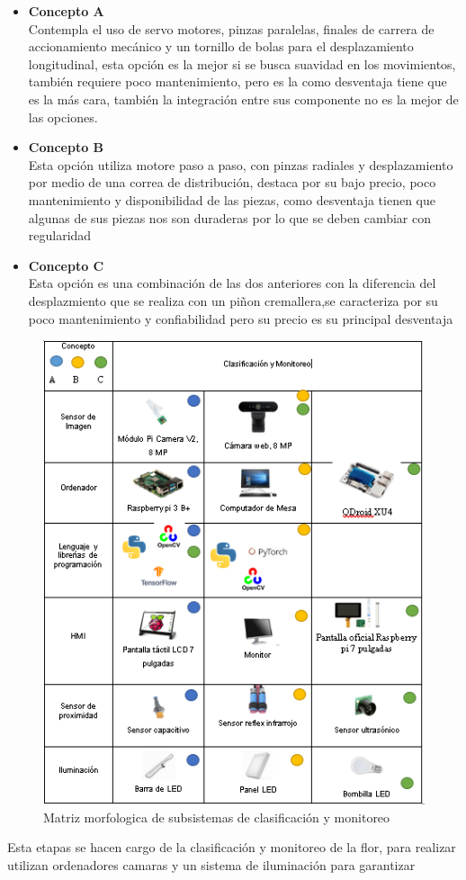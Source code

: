 \begin{itemize}
	\item \textbf{Concepto A}\\
	Contempla el uso de servo motores, pinzas paralelas, finales de carrera de accionamiento mecánico y un tornillo de bolas para el desplazamiento longitudinal, esta opción es la mejor si se busca suavidad en los movimientos, también requiere poco mantenimiento, pero es la como desventaja tiene que es la más cara, también la integración entre sus componente no es la mejor de las opciones.
	\item \textbf{Concepto B}\\
	Esta opción utiliza motore paso a paso, con pinzas radiales y desplazamiento por medio de una correa de distribución, destaca por su bajo precio, poco mantenimiento y disponibilidad de las piezas, como desventaja tienen que algunas de sus piezas nos son duraderas por lo que se deben cambiar con regularidad
	\item \textbf{Concepto C}\\
	Esta opción es una combinación de las dos anteriores con la diferencia del desplazmiento que se realiza con un piñon cremallera,se caracteriza por su poco mantenimiento y confiabilidad pero su precio es su principal desventaja
\end{itemize}



\begin{figure}[H]
	\centering
	\includegraphics{Figuras/Matriz_Clasificacion}
	\caption{Matriz morfologica de subsistemas de clasificación y monitoreo}
	\label{fig:MMClasificación}
\end{figure}
Esta etapas se hacen cargo de la clasificación y monitoreo de la flor, para realizar utilizan ordenadores camaras y un sistema de iluminación para garantizar 

